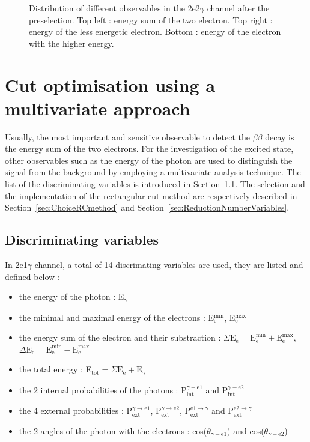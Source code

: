\documentclass[main.tex]{subfiles}
\begin{document}
\begin{figure}[h!]
\caption{Distribution of different observables in the 2e2$\gamma$ channel after the preselection. Top left : energy sum of the two electron. Top right : energy of the less energetic electron. Bottom : energy of the electron with the higher energy.}
\label{preselection2e2g_150_electron}
\end{figure}


\FloatBarrier



\section{Cut optimisation using a multivariate approach}\label{sec:CutOptimisation}


\NI Usually, the most important and sensitive observable to detect the $\beta\beta$ decay is the energy sum of the two electrons. For the investigation of the excited state, other observables such as the energy of the photon are used to distinguish the signal from the background by employing a multivariate analysis technique. The list of the discriminating variables is introduced in Section~\ref{sec:discriminatingVariables}. The selection and the implementation of the rectangular cut method are respectively described in Section~\ref{sec:ChoiceRCmethod} and Section~\ref{sec:ReductionNumberVariables}.


\subsection{Discriminating variables}\label{sec:discriminatingVariables}


In 2e1$\gamma$ channel, a total of 14 discrimating variables are used, they are listed and defined below : 


\begin{itemize}
\item the energy of the photon : E$_{\gamma}$
\item the minimal and maximal energy of the electrons : E$_\text{e}^{\text{min}}$, E$_\text{e}^{\text{max}}$
\item the energy sum of the electron and their substraction : $\Sigma\text{E}_\text{e} = \text{E}_\text{e}^{\text{min}} +  \text{E}_\text{e}^{\text{max}}$,  $\Delta\text{E}_\text{e} = \text{E}_\text{e}^{\text{min}} -  \text{E}_\text{e}^{\text{max}}$
\item the total energy : E$_{\text{tot}} = \Sigma\text{E}_{\text{e}} + \text{E}_{\gamma}$
\item the 2 internal probabilities of the photons : P$_{\text{int}}^{\gamma-\text{e1}}$ and  P$_{\text{int}}^{\gamma-\text{e2}}$
\item the 4 external probabilities : P$_{\text{ext}}^{\gamma \rightarrow \text{e1}}$, P$_{\text{ext}}^{\gamma \rightarrow \text{e2}}$, P$_{\text{ext}}^{ \text{e1} \rightarrow\gamma}$ and P$_{\text{ext}}^{ \text{e2} \rightarrow\gamma}$
\item the 2 angles of the photon with the electrons : cos($\theta_{\gamma-\text{e1}}$) and cos($\theta_{\gamma-\text{e2}}$)
\end{itemize}
\end{document}
